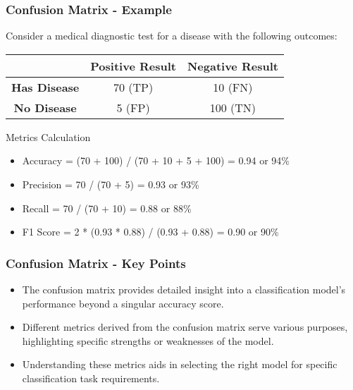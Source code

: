 \documentclass{beamer}
\begin{document}
\begin{frame}[fragile]
    \frametitle{Confusion Matrix - Example}
    Consider a medical diagnostic test for a disease with the following outcomes:
    
    \begin{center}
    \begin{tabular}{|c|c|c|}
      \hline
                   & \textbf{Positive Result} & \textbf{Negative Result} \\
      \hline
      \textbf{Has Disease}   & 70 (TP)             & 10 (FN)             \\
      \hline
      \textbf{No Disease}    & 5 (FP)              & 100 (TN)            \\
      \hline
    \end{tabular}
    \end{center}

    \begin{block}{Metrics Calculation}
    \begin{itemize}
        \item Accuracy = (70 + 100) / (70 + 10 + 5 + 100) = 0.94 or 94\%
        \item Precision = 70 / (70 + 5) = 0.93 or 93\%
        \item Recall = 70 / (70 + 10) = 0.88 or 88\%
        \item F1 Score = 2 * (0.93 * 0.88) / (0.93 + 0.88) = 0.90 or 90\%
    \end{itemize}
    \end{block}
\end{frame}

\begin{frame}[fragile]
    \frametitle{Confusion Matrix - Key Points}
    \begin{itemize}
        \item The confusion matrix provides detailed insight into a classification model's performance beyond a singular accuracy score.
        \item Different metrics derived from the confusion matrix serve various purposes, highlighting specific strengths or weaknesses of the model.
        \item Understanding these metrics aids in selecting the right model for specific classification task requirements.
    \end{itemize}
\end{frame}
\end{document}
